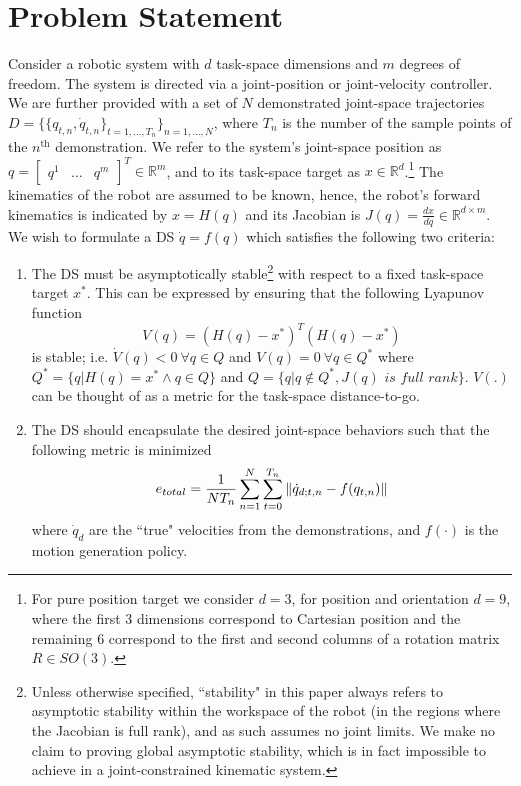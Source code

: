 \documentclass[letterpaper, 10 pt, conference,fleqn]{ieeeconf}
\begin{document}
\section{Problem Statement} \label{Sec:Prob}
Consider a robotic system with $d$ task-space dimensions and $m$ degrees of freedom. The system is directed via a joint-position or joint-velocity controller. We are further provided with a set of $N$ demonstrated joint-space trajectories $D=\{\{q_{t,n},\dot{q}_{t,n}\}_{t=1,\dots, T_n}\}_{n=1,\dots,N}$, where $T_n$ is the number of the sample points of the $n^{\text{th}}$ demonstration. We refer to the system's joint-space position as $q=\begin{bmatrix} q^1 & \dots & q^m
\end{bmatrix}^T \in \mathbb{R}^m$, and to its task-space target as $x\in \mathbb{R}^d$.\footnote{For pure position target we consider $d=3$, for position and orientation $d=9$, where the first 3 dimensions correspond to Cartesian position and the remaining 6 correspond to the first and second columns of a rotation matrix $R \in SO(3)$.} The kinematics of the robot are assumed to be known, hence, the robot's forward kinematics is indicated by $x = H(q)$ and its Jacobian is $J(q) = \frac{dx}{dq}\in \mathbb{R}^{d\times m}$.
We wish to formulate a DS $\dot{q} = f(q)$ which satisfies the following two criteria:
\renewcommand{\labelenumi}{(\Roman{enumi})}
\begin{enumerate}
\item The DS must be asymptotically stable\footnote{Unless otherwise specified, ``stability" in this paper always refers to asymptotic stability within the workspace of the robot (in the regions where the Jacobian is full rank), and as such assumes no joint limits. We make no claim to proving global asymptotic stability, which is in fact impossible to achieve in a joint-constrained kinematic system.} with respect to a fixed task-space target $x^*$. This can be expressed by ensuring that the following Lyapunov function\begin{equation}
V(q) = (H(q) - x^*)^T(H(q) - x^*) 
\label{eq:Lyp}
\end{equation}
is stable; i.e. $\dot{V}(q) < 0 ~\forall q\in Q$ and $V(q)=0~ \forall q\in Q^*$ where $Q^*=\{q|H(q)=x^*\wedge q\in Q\}$ and $Q=\{q|q\notin Q^*, J(q) \textit{ is full rank}\}$. $V(.)$ can be thought of as a metric for the task-space distance-to-go.
\item The DS should encapsulate the desired joint-space behaviors such that the following metric is minimized
\begin{equation}
\vspace{-5pt}
e_{total} = \frac{1}{NT_n}\sum_{n=1}^N\sum_{t=0}^{T_n} \left \| \dot{q}_{d; t,n} - f(q_{t,n}) \right \|
\label{eq:optim_error}
\end{equation}
  where $\dot{q}_d$ are the ``true" velocities from the demonstrations, and $f(\cdot)$ is the motion generation policy.
\end{enumerate}
\end{document}

